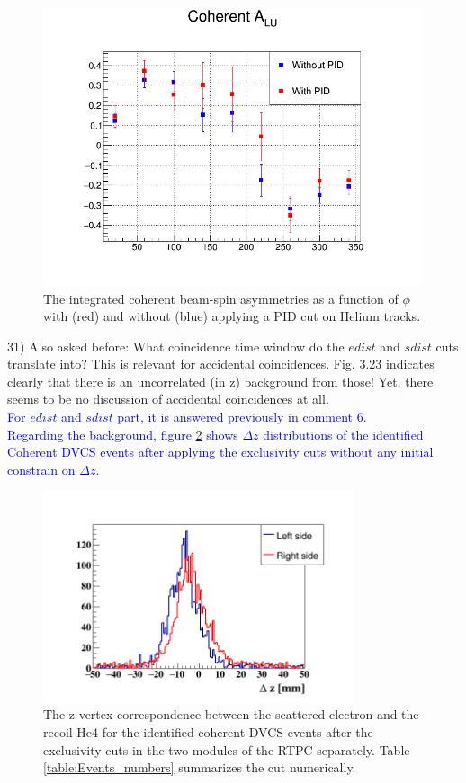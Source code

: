 \begin{figure}[tbp]
   \centering
\includegraphics[height=8.2cm]{fig/Coh_ALU_W_out_PID.png}
\caption{The integrated coherent beam-spin asymmetries as a function of 
$\phi$ with (red) and without (blue) applying a PID cut on Helium tracks.}
\label{fig:coh_alu_PID}
\end{figure}


31) Also asked before: What coincidence time window do the $edist$ and $sdist$ 
cuts translate into? This is relevant for accidental coincidences. Fig. 3.23 
indicates clearly that there is an uncorrelated (in z) background from those!  
Yet, there seems to be no discussion of accidental coincidences at all.\\
\textcolor{blue}{For $edist$ and $sdist$ part, it is answered previously in 
comment 6.}\\

\textcolor{blue}{ Regarding the background, figure 
\ref{fig:delta_z_after_exclusitivty} shows $\Delta z$ distributions of the 
identified Coherent DVCS events after applying the exclusivity cuts without any 
initial constrain on $\Delta z$.}\\

\begin{figure}[tbp]
\centering
\includegraphics[height=6.2cm]{fig/rtpc_delta_z.png}
\caption{The z-vertex correspondence between the scattered electron and the 
recoil He4 for the identified coherent DVCS events after the exclusivity cuts 
in the two modules of the RTPC separately. Table \ref{table:Events_numbers} 
summarizes the cut numerically. }
\label{fig:delta_z_after_exclusitivty}
 \end{figure}



